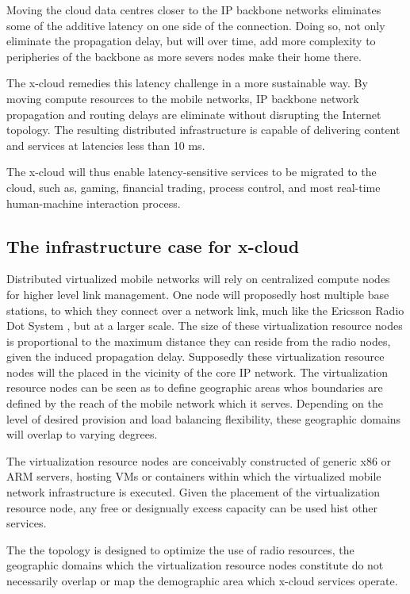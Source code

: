 \documentclass[conference]{IEEEtran}
\newcommand{\xcloud}{x-cloud }
\begin{document}
Moving the cloud data centres closer to the IP backbone networks eliminates some of the additive latency on one side of the connection. Doing so, not only eliminate the propagation delay, but will over time, add more complexity to peripheries of the backbone as more severs nodes make their home there. 

The \xcloud remedies this latency challenge in a more sustainable way. By moving compute resources to the mobile networks, IP backbone network propagation and routing delays are eliminate without disrupting the Internet topology. The resulting distributed infrastructure is capable of delivering content and services at latencies less than 10 ms. 

The \xcloud will thus enable latency-sensitive services to be migrated to the cloud, such as, gaming, financial trading, process control, and most real-time human-machine interaction process.

\subsection{The infrastructure case for \xcloud}
Distributed virtualized mobile networks will rely on centralized compute nodes for higher level link management. One node will proposedly host multiple base stations, to which they connect over a network link, much like the Ericsson Radio Dot System \cite{ericsson_dot}, but at a larger scale. The size of these virtualization resource nodes is proportional to the maximum distance they can reside from the radio nodes, given the induced propagation delay. Supposedly these virtualization resource nodes will the placed in the vicinity of the core IP network. The virtualization resource nodes can be seen as to define geographic areas whos boundaries are defined by the reach of the mobile network which it serves. Depending on the level of desired provision and load balancing flexibility, these geographic domains will overlap to varying degrees.

The virtualization resource nodes are conceivably constructed of generic x86 or ARM servers, hosting VMs or containers within which the virtualized mobile network infrastructure is executed. Given the placement of the virtualization resource node, any free or designually excess capacity can be used hist other services.

The the topology is designed to optimize the use of radio resources, the geographic domains which the virtualization resource nodes constitute do not necessarily overlap or map the demographic area which \xcloud services operate.
\end{document}
